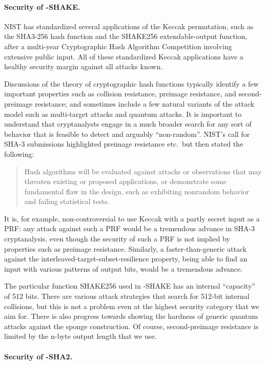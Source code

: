 \paragraph{Security of \SPHINCSA-SHAKE.}

NIST has standardized several applications of the Keccak permutation, such as the SHA3-256 hash function and the SHAKE256 extendable-output function, after a multi-year Cryptographic Hash Algorithm Competition involving extensive public input. All of these standardized Keccak applications have a healthy security margin against all attacks known.

Discussions of the theory of cryptographic hash functions typically identify a few important properties such as collision resistance, preimage resistance, and second-preimage resistance; and sometimes include a few natural variants of the attack model such as multi-target attacks and quantum attacks. It is important to understand that cryptanalysts engage in a much broader search for any sort of behavior that is feasible to detect and arguably ``non-random''. NIST's call for SHA-3 submissions highlighted preimage resistance etc.~but then stated the following:

\begin{quote}
    Hash algorithms will be evaluated against attacks or observations that may threaten existing or proposed applications, or demonstrate some fundamental flaw in the design, such as exhibiting nonrandom behavior and failing statistical tests.
\end{quote}
It is, for example, non-controversial to use Keccak with a partly secret input as a PRF: any attack against such a PRF would be a tremendous advance in SHA-3 cryptanalysis, even though the security of such a PRF is not implied by properties such as preimage resistance. Similarly, a faster-than-generic attack against the interleaved-target-subset-resilience property, being able to find an input with various patterns of output bits, would be a tremendous advance.

The particular function SHAKE256 used in \SPHINCSA-SHAKE has an internal “capacity” of 512 bits. There are various attack strategies that search for 512-bit internal collisions, but this is not a problem even at the highest security category that we aim for. There is also progress towards showing the hardness of generic quantum attacks against the sponge construction. Of course, second-preimage resistance is limited by the n-byte output length that we use.

\paragraph{Security of \SPHINCSA-SHA2.}

